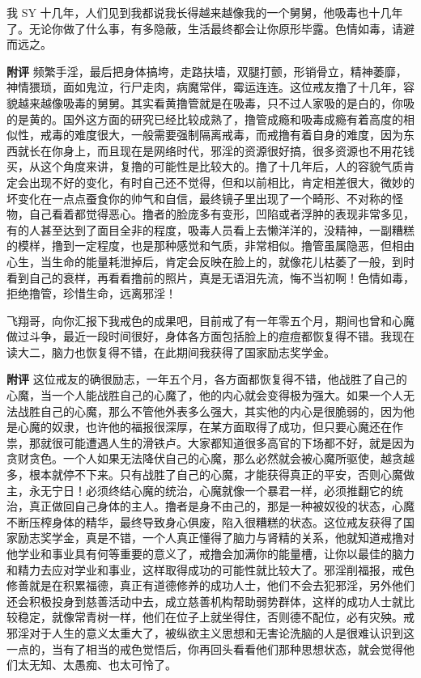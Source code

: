 \begin{case}
    我 SY 十几年，人们见到我都说我长得越来越像我的一个舅舅，他吸毒也十几年了。无论你做了什么事，有多隐蔽，生活最终都会让你原形毕露。色情如毒，请避而远之。

    \textbf{附评} 频繁手淫，最后把身体搞垮，走路扶墙，双腿打颤，形销骨立，精神萎靡，神情猥琐，面如鬼泣，行尸走肉，病魔常伴，霉运连连。这位戒友撸了十几年，容貌越来越像吸毒的舅舅。其实看黄撸管就是在吸毒，只不过人家吸的是白的，你吸的是黄的。国外这方面的研究已经比较成熟了，撸管成瘾和吸毒成瘾有着高度的相似性，戒毒的难度很大，一般需要强制隔离戒毒，而戒撸有着自身的难度，因为东西就长在你身上，而且现在是网络时代，邪淫的资源很好搞，很多资源也不用花钱买，从这个角度来讲，复撸的可能性是比较大的。撸了十几年后，人的容貌气质肯定会出现不好的变化，有时自己还不觉得，但和以前相比，肯定相差很大，微妙的坏变化在一点点蚕食你的帅气和自信，最终镜子里出现了一个畸形、不对称的怪物，自己看着都觉得恶心。撸者的脸庞多有变形，凹陷或者浮肿的表现非常多见，有的人甚至达到了面目全非的程度，吸毒人员看上去懒洋洋的，没精神，一副糟糕的模样，撸到一定程度，也是那种感觉和气质，非常相似。撸管虽属隐恶，但相由心生，当生命的能量耗泄掉后，肯定会反映在脸上的，就像花儿枯萎了一般，到时看到自己的衰样，再看看撸前的照片，真是无语泪先流，悔不当初啊！色情如毒，拒绝撸管，珍惜生命，远离邪淫！
\end{case}

\begin{case}
    飞翔哥，向你汇报下我戒色的成果吧，目前戒了有一年零五个月，期间也曾和心魔做过斗争，最近一段时间很好，身体各方面包括脸上的痘痘都恢复得不错。我现在读大二，脑力也恢复得不错，在此期间我获得了国家励志奖学金。

    \textbf{附评} 这位戒友的确很励志，一年五个月，各方面都恢复得不错，他战胜了自己的心魔，当一个人能战胜自己的心魔了，他的内心就会变得极为强大。如果一个人无法战胜自己的心魔，那么不管他外表多么强大，其实他的内心是很脆弱的，因为他是心魔的奴隶，也许他的福报很深厚，在某方面取得了成功，但只要心魔还在作祟，那就很可能遭遇人生的滑铁卢。大家都知道很多高官的下场都不好，就是因为贪财贪色。一个人如果无法降伏自己的心魔，那么必然就会被心魔所驱使，越贪越多，根本就停不下来。只有战胜了自己的心魔，才能获得真正的平安，否则心魔做主，永无宁日！必须终结心魔的统治，心魔就像一个暴君一样，必须推翻它的统治，真正做回自己身体的主人。撸者是身不由己的，那是一种被奴役的状态，心魔不断压榨身体的精华，最终导致身心俱废，陷入很糟糕的状态。这位戒友获得了国家励志奖学金，真是不错，一个人真正懂得了脑力与肾精的关系，他就知道戒撸对他学业和事业具有何等重要的意义了，戒撸会加满你的能量槽，让你以最佳的脑力和精力去应对学业和事业，这样取得成功的可能性就比较大了。邪淫削福报，戒色修善就是在积累福德，真正有道德修养的成功人士，他们不会去犯邪淫，另外他们还会积极投身到慈善活动中去，成立慈善机构帮助弱势群体，这样的成功人士就比较稳定，就像常青树一样，他们在位子上就坐得住，否则德不配位，必有灾殃。戒邪淫对于人生的意义太重大了，被纵欲主义思想和无害论洗脑的人是很难认识到这一点的，当有了相当的戒色觉悟后，你再回头看看他们那种思想状态，就会觉得他们太无知、太愚痴、也太可怜了。
\end{case}

